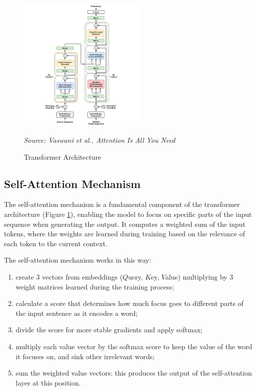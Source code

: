 \begin{figure}[ht!]
  \centering
  \includegraphics[width=0.55\textwidth]{
    images/background/transformer_architecture.png
  }
  \caption{Transformer Architecture}
  {\emph{Source: Vaswani et al., Attention Is All You Need \cite{vaswani2023attentionneed}}}
  \label{fig:transformer_architecture}
\end{figure}

\subsection{Self-Attention Mechanism}
\label{sub:attention_mechanism}

The self-attention mechanism is a fundamental component of the transformer architecture
(Figure \ref{fig:transformer_architecture}), enabling the model to focus on
specific parts of the input sequence when generating the output. It computes a weighted
sum of the input tokens, where the weights are learned during training based on
the relevance of each token to the current context.

The self-attention mechanism works in this way:
\begin{enumerate}
  \item create 3 vectors from embeddings ($Q$uery, $K$ey, $V$alue) multiplying
    by 3 weight matrices learned during the training process;

  \item calculate a score that determines how much focus goes to different parts
    of the input sentence as it encodes a word;

  \item divide the score for more stable gradients and apply softmax;

  \item multiply each value vector by the softmax score to keep the value of the
    word it focuses on, and sink other irrelevant words;

  \item sum the weighted value vectors: this produces the output of the self-attention
    layer at this position.
\end{enumerate}

